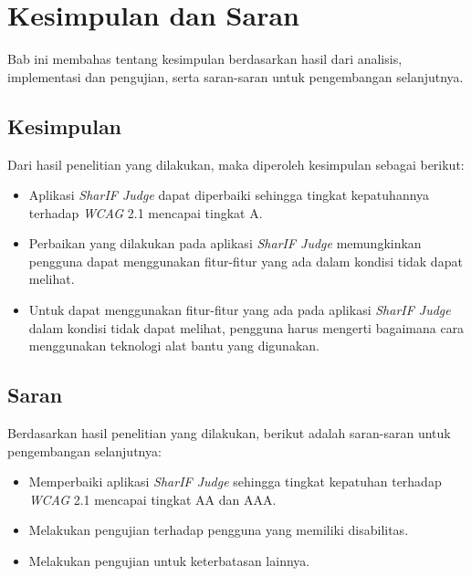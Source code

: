 \chapter{Kesimpulan dan Saran}
\label{chap:kesimpulan_dan_saran}

Bab ini membahas tentang kesimpulan berdasarkan hasil dari analisis, implementasi dan pengujian, serta saran-saran untuk pengembangan selanjutnya.

\section{Kesimpulan}
\label{sec:kesimpulan}
Dari hasil penelitian yang dilakukan, maka diperoleh kesimpulan sebagai berikut:
\begin{itemize}
	\item Aplikasi \textit{SharIF Judge} dapat diperbaiki sehingga tingkat kepatuhannya terhadap \textit{WCAG} 2.1 mencapai tingkat A.
	\item Perbaikan yang dilakukan pada aplikasi \textit{SharIF Judge} memungkinkan pengguna dapat menggunakan fitur-fitur yang ada dalam kondisi tidak dapat melihat.
	\item Untuk dapat menggunakan fitur-fitur yang ada pada aplikasi \textit{SharIF Judge} dalam kondisi tidak dapat melihat, pengguna harus mengerti bagaimana cara menggunakan teknologi alat bantu yang digunakan.
\end{itemize}

\section{Saran}
\label{sec:saran}
Berdasarkan hasil penelitian yang dilakukan, berikut adalah saran-saran untuk pengembangan selanjutnya:
\begin{itemize}
	\item Memperbaiki aplikasi \textit{SharIF Judge} sehingga tingkat kepatuhan terhadap \textit{WCAG} 2.1 mencapai tingkat AA dan AAA.
	\item Melakukan pengujian terhadap pengguna yang memiliki disabilitas.
	\item Melakukan pengujian untuk keterbatasan lainnya.
\end{itemize}